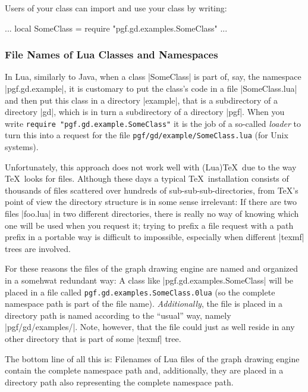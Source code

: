 Users of your class can import and use your class by writing:
\begin{codeexample}
...
local SomeClass = require "pgf.gd.examples.SomeClass"
...  
\end{codeexample}



\subsubsection{File Names of Lua Classes and Namespaces}

In Lua, similarly to Java, when a class |SomeClass| is part of, say,
the namespace |pgf.gd.example|, it is customary to put the class's
code in a file |SomeClass.lua| and then put this class in a directory
|example|, that is a subdirectory of a directory |gd|, which is in
turn a subdirectory of a directory |pgf|. When you write
\texttt{require "pgf.gd.example.SomeClass"} it is the job of a
so-called \emph{loader} to turn this into a request for the file
\texttt{pgf/gd/example/SomeClass.lua} (for Unix systems).

Unfortunately, this approach does not work well with (Lua)\TeX\ due to
the way \TeX\ looks for files. Although these days a typical \TeX\
installation consists of thousands of files scattered over hundreds of
sub-sub-sub-directories, from \TeX's point of view the directory
structure is in some sense irrelevant: If there are two files
|foo.lua| in two different directories, there is really no way of
knowing which one will be used when you request it; trying to prefix a
file request with a path prefix in a portable way is difficult to
impossible, especially when different |texmf| trees are involved.

For these reasons the files of the graph drawing engine are named and
organized in a somehwat redundant way: A class like
|pgf.gd.examples.SomeClass| will be placed in a file called
\texttt{pgf.gd.examples.SomeClass.\penalty0lua} (so the complete namespace path is
part of the file name). \emph{Additionally}, the file is placed in a
directory path is named according to the ``usual'' way, namely
|pgf/gd/examples/|. Note, however, that the file could just as well
reside in any other directory that is part of some |texmf| tree.

The bottom line of all this is: Filenames of Lua files of the graph
drawing engine contain the complete namespace path and, additionally,
they are placed in a directory path also representing the complete
namespace path. 




